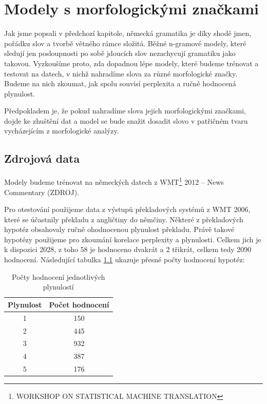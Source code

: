 \documentclass[12pt,a4paper]{report}
\begin{document}
\chapter{Modely s morfologickými značkami}
Jak jsme popsali v předchozí kapitole, německá gramatika je díky shodě jmen, pořádku slov a tvorbě větného rámce složitá. Běžné n-gramové modely, které sledují jen posloupnosti po sobě jdoucích slov nezachycují gramatiku jako takovou. Vyzkoušíme proto, zda dopadnou lépe modely, které budeme trénovat a testovat na datech, v nichž nahradíme slova za různé morfologické značky. Budeme na nich zkoumat, jak spolu souvisí perplexita a ručně hodnocená plynulost.

Předpokladem je, že pokud nahradíme slova jejich morfologickými značkami, dojde ke zhuštění dat a model se bude snažit dosadit slovo v patřičném tvaru vycházejícím z morfologické analýzy.

\section{Zdrojová data}
Modely budeme trénovat na německých datech z WMT\footnote{WORKSHOP ON STATISTICAL MACHINE TRANSLATION} 2012 -- News Commentary (ZDROJ).

Pro otestování použijeme data z výstupů překladových systémů z WMT 2006, které se účastnily překladu z angličtiny do němčiny. Některé z překladových hypotéz obsahovaly ručně ohodnocenou plynulost překladu. Právě takové hypotézy použijeme pro zkoumání korelace perplexity a plynulosti. Celkem jich je k dispozici 2028, z toho 58 je hodnoceno dvakrát a 2 třikrát, celkem tedy 2090 hodnocení. Následující tabulka \ref{tb:poctyfluency} ukazuje přesné počty hodnocení hypotéz:

\begin{table}[!htbp]
\begin{center}\begin{tabular}{|c|c|}
	\hline
	\textbf{Plynulost} & \textbf{Počet hodnocení}\\
	\hline
	1 & 150\\
	\hline
	2 & 445\\
	\hline
	3 & 932\\
	\hline
	4 & 387\\
	\hline
	5 & 176\\
	\hline
\end{tabular}
\caption{Počty hodnocení jednotlivých plynulostí}\label{tb:poctyfluency}
\end{center}
\end{table}
\end{document}
